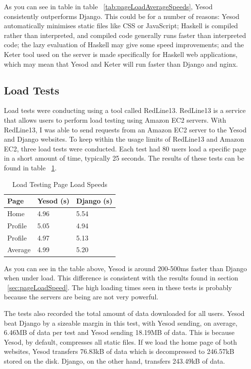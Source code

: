 As you can see in table in table ~\ref{tab:pageLoadAverageSpeeds}, Yesod
consistently outperforms Django. This could be for a number of reasons:
Yesod automatically minimises static files like CSS or JavaScript;
Haskell is compiled rather than interpreted, and compiled code generally
runs faster than interpreted code; the lazy evaluation of Haskell may
give some speed improvements; and the Keter tool used on the server
is made specifically for Haskell web applications, which may mean that
Yesod and Keter will run faster than Django and nginx.

\subsection{Load Tests}

Load tests were conducting using a tool called RedLine13. RedLine13 is
a service that allows users to perform load testing using Amazon EC2
servers. With RedLine13, I was able to send requests from an Amazon
EC2 server to the Yesod and Django websites. To keep within the
usage limits of RedLine13 and Amazon EC2, three load tests were
conducted. Each test had 80 users load a specific page in a short
amount of time, typically 25 seconds. The results of these tests can
be found in table ~\ref{tab:loadTests}.

\begin{table}[H]
	\caption{Load Testing Page Load Speeds}
	\begin{center}
		\begin{tabular}{ | l | l | l |}
			\hline
			Page & Yesod (s) & Django (s) \\
			\hline
			Home & 4.96 & 5.54 \\
			Profile & 5.05 & 4.94 \\
			Profile & 4.97 & 5.13 \\
			Average & 4.99 & 5.20 \\
			\hline
		\end{tabular}
	\end{center}
	\label{tab:loadTests}
\end{table}

As you can see in the table above, Yesod is around 200-500ms faster than
Django when under load. This difference is consistent with the results
found in section ~\ref{sec:pageLoadSpeed}. The high loading times
seen in these tests is probably because the servers are being are not
very powerful.

The tests also recorded the total amount of data downloaded for all
users. Yesod beat Django by a sizeable margin in this test, with
Yesod sending, on average, 6.46MB of data per test and Yesod
sending 18.19MB of data. This is because Yesod, by default, compresses
all static files. If we load the home page of both websites, Yesod
transfers 76.83kB of data which is decompressed to 246.57kB stored
on the disk. Django, on the other hand, transfers 243.49kB of data.

